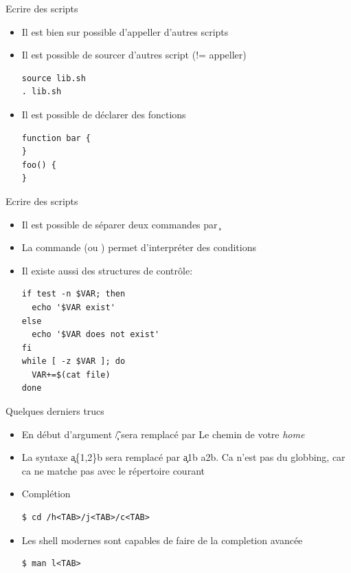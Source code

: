 \begin{frame}[fragile=singleslide]{Ecrire des scripts}
  \begin{itemize}
  \item Il est bien sur possible d'appeller d'autres scripts
  \item Il est possible de sourcer d'autres script (!= appeller)
    \begin{lstlisting}
source lib.sh
. lib.sh
    \end{lstlisting}
  \item Il est possible de déclarer des fonctions
    \begin{lstlisting}
function bar {
}
foo() {
}
    \end{lstlisting}
  \end{itemize}
\end{frame}

\begin{frame}[fragile=singleslide]{Ecrire des scripts}
  \begin{itemize}
  \item Il est possible de séparer deux commandes par \c{\;}
  \item La commande  (ou \man{[(1)}) permet d'interpréter
    des conditions
  \item Il existe aussi des structures de contrôle:
    \begin{lstlisting}
if test -n $VAR; then
  echo '$VAR exist'
else
  echo '$VAR does not exist'
fi
while [ -z $VAR ]; do
  VAR+=$(cat file)
done
    \end{lstlisting}
  \end{itemize}
\end{frame}

\begin{frame}[fragile=singleslide]{Quelques derniers trucs}
  \begin{itemize}
  \item En  début d'argument  \c{\~/} sera remplacé  par Le  chemin de
    votre \emph{home}
  \item  La syntaxe \c{a\{1,2\}b}  sera remplacé  par \c{a1b  a2b}. Ca
    n'est pas  du globbing,  car ca ne  matche pas avec  le répertoire
    courant
  \item Complétion
    \begin{lstlisting}
$ cd /h<TAB>/j<TAB>/c<TAB>
    \end{lstlisting}
  \item Les  shell modernes sont  capables de faire de  la completion
    avancée
    \begin{lstlisting}
$ man l<TAB>
    \end{lstlisting}
  \end{itemize}
\end{frame}

